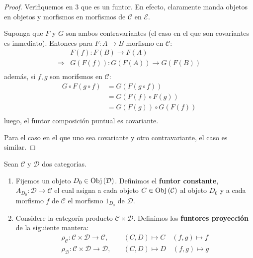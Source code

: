 \documentclass[12pt]{report}
\theoremstyle{largebreak}
\newcommand\cf[3]{\ensuremath{#1:#2\rightarrow#3}}
\newcommand{\Obj}[1]{\ensuremath{\textup{Obj}\left(#1\right)}}
\begin{document}
    \begin{proof}
        Verifiquemos en 3 que es un funtor. En efecto, claramente manda objetos en objetos y morfismos en morfismos de $\mathcal{C}$ en $\mathcal{E}$.
        
        Suponga que $F$ y $G$ son ambos contravariantes (el caso en el que son covariantes es inmediato). Entonces para $\cf{F}{A}{B}$ morfismo en $\mathcal{C}$:
        \begin{equation*}
            \begin{split}
                &\cf{F(f)}{F(B)}{F(A)}\\
                \Rightarrow &\cf{G(F(f))}{G(F(A))}{G(F(B))}\\
            \end{split}
        \end{equation*}
        además, si $f,g$ son morifsmos en $\mathcal{C}$:
        \begin{equation*}
            \begin{split}
                G\circ F(g\circ f)&=G(F(g\circ f))\\
                &=G(F(f)\circ F(g))\\
                &=G(F(g))\circ G(F(f))\\
            \end{split}
        \end{equation*}
        luego, el funtor composición puntual es covariante.

        Para el caso en el que uno sea covariante y otro contravariante, el caso es similar.
    \end{proof}

    \begin{mydef}
        Sean $\mathcal{C}$ y $\mathcal{D}$ dos categorías.
        \begin{enumerate}
            \item Fijemos un objeto $D_0\in\Obj{\mathcal{D}}$. Definimos el \textbf{funtor constante}, $\cf{A_{D_0}}{\mathcal{D}}{\mathcal{C}}$ el cual asigna a cada objeto $C\in\Obj{\mathcal{C}}$ al objeto $D_0$ y a cada morfismo $f$ de $\mathcal{C}$ el morfismo $1_{D_0}$ de $\mathcal{D}$.
            \item Considere la categoría producto $\mathcal{C}\times\mathcal{D}$. Definimos los \textbf{funtores proyección} de la siguiente mantera:
            \begin{equation*}
                \begin{split}
                    \cf{\rho_{\mathcal{C}}}{\mathcal{C}\times\mathcal{D}}{\mathcal{C}}, &\quad(C,D)\mapsto C\quad (f,g)\mapsto f \\
                    \cf{\rho_{\mathcal{D}}}{\mathcal{C}\times\mathcal{D}}{\mathcal{D}}, &\quad(C,D)\mapsto D\quad (f,g)\mapsto g \\
                \end{split}
            \end{equation*}
        \end{enumerate}
    \end{mydef}
\end{document}
